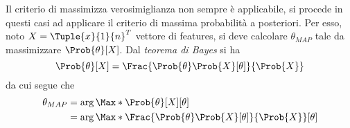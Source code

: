 \documentclass{subfiles}
\begin{document}
Il criterio di massimizza verosimiglianza non sempre è applicabile, si procede in questi casi ad applicare il criterio di massima probabilità a posteriori.
Per esso, noto \(X = \Tuple{x}{1}{n}^{T}\) vettore di features, si deve calcolare \(\theta_{MAP}\) tale da massimizzare \(\Prob{\theta}[X]\).
Dal \emph{teorema di Bayes} si ha
\[
    \Prob{\theta}[X] = \Frac{\Prob{\theta}\Prob{X}[\theta]}{\Prob{X}}
\]
da cui segue che
\[\begin{aligned}
        \theta_{MAP} & = \arg \Max*{\Prob{\theta}[X]}[\theta]                               \\
                     & = \arg \Max*{\Frac{\Prob{\theta}\Prob{X}[\theta]}{\Prob{X}}}[\theta]
    \end{aligned}\]
\end{document}
